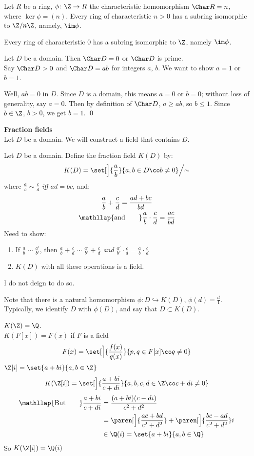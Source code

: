 Let $R$ be a ring, $\phi\colon\Z\to R$ the characteristic homomorphism $\Char R=n$, where $\ker\phi=(n)$.  Every ring of characteristic $n>0$ has a subring isomorphic to $\Z/n\Z$, namely, $\im\phi$.

Every ring of characteristic $0$ has a subring isomorphic to $\Z$, namely $\im\phi$.

\thm Let $D$ be a domain.  Then $\Char D=0$ or $\Char D$ is prime. \\
\pf Say $\Char D>0$ and $\Char D=ab$ for integers $a$, $b$.  We want to show $a=1$ or $b=1$.

Well, $ab=0$ in $D$.  Since $D$ is a domain, this means $a=0$ or $b=0$; without loss of generality, say $a=0$.  Then by definition of $\Char D$, $a\geq ab$, so $b\leq1$.  Since $b\in\Z$, $b>0$, we get $b=1$. \qed

\textbf{Fraction fields} \\
Let $D$ be a domain.  We will construct a field that contains $D$.

 Let $D$ be a domain.  Define the fraction field $K(D)$ by:
\[ K(D) = \set[\Big]{\frac{a}{b}}{a,b\in D\co b\neq0} \Big/ \mathord\sim \]
where $\frac{a}{b}\sim\frac{c}{d}$ \emph{iff} $ad=bc$, and:
\begin{gather*}
\frac{a}{b} + \frac{c}{d} = \frac{ad+bc}{bd} \\
\mathllap{\text{and}\qquad} \frac{a}{b} \cdot \frac{c}{d} = \frac{ac}{bd}
\end{gather*}
Need to show:
\begin{enumerate}[label=(\arabic*)]
\item If $\frac{a}{b}\sim\frac{a'}{b'}$, then $\frac{a}{b}+\frac{c}{d}\sim\frac{a'}{b'}+\frac{c}{d}$ \emph{and} $\frac{a'}{b'}\cdot\frac{c}{d}=\frac{a}{b}\cdot\frac{c}{d}$
\item $K(D)$ with all these operations is a field.
\end{enumerate}
I do not deign to do so.

Note that there is a natural homomorphism $\phi\colon D\hookrightarrow K(D)$, $\phi(d)=\frac{d}{1}$.  Typically, we identify $D$ with $\phi(D)$, and say that $D\subset K(D)$.

\eg $K(\Z)=\Q$. \\
\eg $K(F[x])=F(x)$ if $F$ is a field
\[ F(x) = \set[\Big]{\frac{f(x)}{q(x)}}{p,q\in F[x]\co q\neq0} \]
\eg $\Z[i]=\set{a+bi}{a,b\in\Z}$
\[ K(\Z[i]) = \set[\Big]{\frac{a+bi}{c+di}}{a,b,c,d\in\Z\co c+di\neq0} \]
\begin{align*}
\mathllap{\text{But}\qquad} \frac{a+bi}{c+di} &= \frac{(a+bi)(c-di)}{c^2+d^2} \\
&= \paren[\Big]{\frac{ac+bd}{c^2+d^2}}+\paren[\Big]{\frac{bc-ad}{c^2+d^2}} i \\
&\in \Q(i) = \set{a+bi}{a,b\in\Q}
\end{align*}%
So $K(\Z[i])=\Q(i)$

